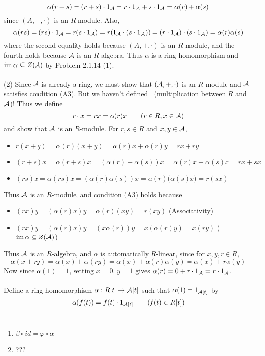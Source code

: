 $$\alpha(r+s) = (r+s)\cdot 1_{\mathcal{A}} = r\cdot 1_{\mathcal{A}} + s\cdot1_{\mathcal{A}} = \alpha(r) + \alpha(s)$$
since $(A, +, \cdot)$ is an $R$-module. Also,
$$\alpha(rs) = (rs)\cdot 1_{\mathcal{A}} = r(s\cdot 1_{\mathcal{A}}) = r(1_{\mathcal{A}}\cdot (s\cdot 1_{\mathcal{A}})) = (r\cdot 1_{\mathcal{A}})\cdot (s\cdot 1_{\mathcal{A}}) = \alpha(r)\alpha(s)$$
where the second equality holds because $(A, +, \cdot)$ is an $R$-module, and the fourth holds because $\mathcal{A}$ is an $R$-algebra. Thus $\alpha$ is a ring homomorphism and $\operatorname{im} \alpha \subseteq Z(\mathcal{A})$ by {\sffamily Problem 2.1.14} (1).
\\
\\
(2) Since $\mathcal{A}$ is already a ring, we must show that $(\mathcal{A}, +, \cdot)$ is an $R$-module and $\mathcal{A}$ satisfies condition {\sffamily (A3)}. But we haven't defined $\cdot$ (multiplication between $R$ and $\mathcal{A}$)! Thus we define
$$r\cdot x =rx= \alpha(r)x \qquad (r\in R, x\in \mathcal{A})$$
and show that $\mathcal{A}$ is an $R$-module. For $r, s\in R$ and $x, y\in \mathcal{A}$,
\begin{itemize}
	\item $ r(x+y) = \alpha(r)(x+y) = \alpha(r)x + \alpha(r)y = rx + ry $
	\item $(r+s)x = \alpha(r+s)x = (\alpha(r) + \alpha(s))x = \alpha(r)x + \alpha(s)x = rx+sx$
	\item $(rs)x = \alpha(rs)x = (\alpha(r)\alpha(s))x = \alpha(r)\big(\alpha(s)x\big) = r(sx)$
\end{itemize}
Thus $\mathcal{A}$ is an $R$-module, and condition {\sffamily (A3)} holds because
\begin{itemize}
	\item $(rx)y = (\alpha(r)x)y = \alpha(r)(xy) = r(xy)$ (Associativity)
	\item $(rx)y = (\alpha(r)x)y = (x\alpha(r))y = x(\alpha(r)y) = x(ry)$ ($\operatorname{im} \alpha \subseteq Z(\mathcal{A})$)
\end{itemize}
Thus $\mathcal{A}$ is an $R$-algebra, and $\alpha$ is automatically $R$-linear, since for $x, y, r\in R$,
$$\alpha(x +ry) = \alpha(x) + \alpha(ry) = \alpha(x) + \alpha(r)\alpha(y) = \alpha(x) + r\alpha(y)$$
Now since $\alpha(1) = 1$, setting $x = 0$, $y=1$ gives $\alpha(r) = 0 + r\cdot 1_{\mathcal{A}} = r\cdot 1_{\mathcal{A}}$.\\
\\
 Define a ring homomorphism $\alpha : R[t]\rightarrow \mathcal{A}[t]$ such that $\alpha(1) = 1_{\mathcal{A}[t]}$ by
$$\alpha(f(t)) = f(t)\cdot 1_{\mathcal{A}[t]} \qquad (f(t)\in R[t])$$
\\
\begin{enumerate}
	\item $\beta \circ id = \varphi \circ \alpha$
	\item ???
\end{enumerate}~
\pagebreak